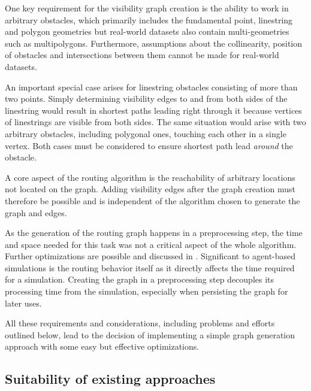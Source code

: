 		One key requirement for the visibility graph creation is the ability to work in arbitrary obstacles, which primarily includes the fundamental point, linestring and polygon geometries but real-world datasets also contain multi-geometries such as multipolygons.
		Furthermore, assumptions about the collinearity, position of obstacles and intersections between them cannot be made for real-world datasets.
		
		An important special case arises for linestring obstacles consisting of more than two points.
		Simply determining visibility edges to and from both sides of the linestring would result in shortest paths leading right through it because vertices of linestrings are visible from both sides.
		The same situation would arise with two arbitrary obstacles, including polygonal ones, touching each other in a single vertex.
		Both cases must be considered to ensure shortest path lead \emph{around} the obstacle.
		
		
		A core aspect of the routing algorithm is the reachability of arbitrary locations not located on the graph.
		Adding visibility edges after the graph creation must therefore be possible and is independent of the algorithm chosen to generate the graph and edges.
		
		As the generation of the routing graph happens in a preprocessing step, the time and space needed for this task was not a critical aspect of the whole algorithm.
		Further optimizations are possible and discussed in .
		Significant to agent-based simulations is the routing behavior itself as it directly affects the time required for a simulation.
		Creating the graph in a preprocessing step decouples its processing time from the simulation, especially when persisting the graph for later uses.
		
		All these requirements and considerations, including problems and efforts outlined below, lead to the decision of implementing a simple graph generation approach with some easy but effective optimizations.
	
	\subsection{Suitability of existing approaches}
	\label{subsec:suitablilty-edge-creation-approaches}

